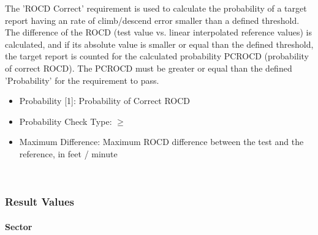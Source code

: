 The 'ROCD Correct' requirement is used to calculate the probability of a target report having an rate of climb/descend error smaller than a defined threshold. The difference of the ROCD (test value vs. linear interpolated reference values) is calculated, and if its absolute value is smaller or equal than the defined threshold, the target report is counted for the calculated probability PCROCD (probability of correct ROCD). The PCROCD must be greater or equal than the defined 'Probability' for the requirement to pass. \\

\begin{itemize}  
\item Probability [1]: Probability of Correct ROCD
\item Probability Check Type: $\geq$
\item Maximum Difference: Maximum ROCD difference between the test and the reference, in feet / minute
\end{itemize}
\ \\

\subsubsection{Result Values}

\paragraph{Sector}

